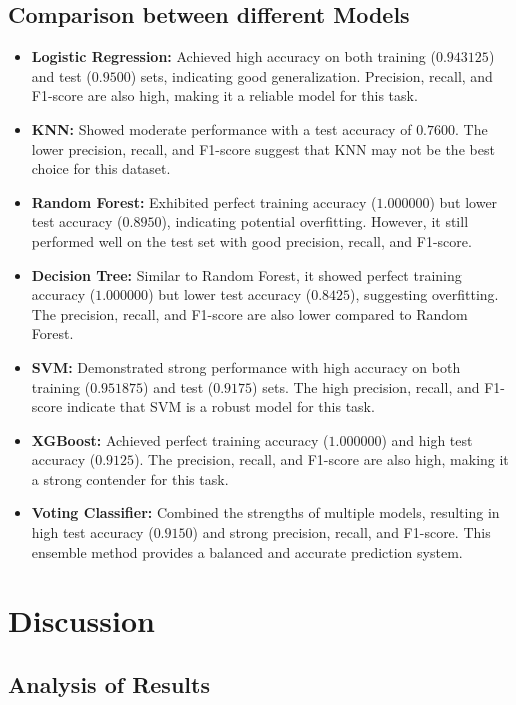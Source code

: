 \documentclass[12pt]{report}
\begin{document}
\section{Comparison between different Models}
\begin{itemize}
	\setlength\itemsep{-1.05em}
	\item \textbf{Logistic Regression:} Achieved high accuracy on both training ($0.943125$) and test ($0.9500$) sets, indicating good generalization. Precision, recall, and F1-score are also high, making it a reliable model for this task.
	\item \textbf{KNN:} Showed moderate performance with a test accuracy of $0.7600$. The lower precision, recall, and F1-score suggest that KNN may not be the best choice for this dataset.
	\item \textbf{Random Forest:} Exhibited perfect training accuracy ($1.000000$) but lower test accuracy ($0.8950$), indicating potential overfitting. However, it still performed well on the test set with good precision, recall, and F1-score.
	\item \textbf{Decision Tree:} Similar to Random Forest, it showed perfect training accuracy ($1.000000$) but lower test accuracy ($0.8425$), suggesting overfitting. The precision, recall, and F1-score are also lower compared to Random Forest.
	\item \textbf{SVM:} Demonstrated strong performance with high accuracy on both training ($0.951875$) and test ($0.9175$) sets. The high precision, recall, and F1-score indicate that SVM is a robust model for this task.
	\item \textbf{XGBoost:} Achieved perfect training accuracy ($1.000000$) and high test accuracy ($0.9125$). The precision, recall, and F1-score are also high, making it a strong contender for this task.
	\item \textbf{Voting Classifier:} Combined the strengths of multiple models, resulting in high test accuracy ($0.9150$) and strong precision, recall, and F1-score. This ensemble method provides a balanced and accurate prediction system.
\end{itemize}

\chapter{Discussion}
\section{Analysis of Results}
\end{document}
